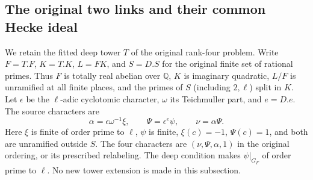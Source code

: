 \subsection{The original two links and their common Hecke ideal}
\label{subsec:rh-rank-four-link-ideal}

We retain the fitted deep tower $T$ of the original rank-four problem.
Write $F=T.F$, $K=T.K$, $L=FK$, and $S=D.S$ for the original finite
set of rational primes. Thus $F$ is totally real abelian over
$\mathbb Q$, $K$ is imaginary quadratic, $L/F$ is unramified at all
finite places, and the primes of $S$ (including $2,\ell$) split in $K$.
Let $\epsilon$ be the $\ell$-adic cyclotomic character,
$\omega$ its Teichmuller part, and $e=D.e$. The source characters are
\[
 \alpha=\epsilon\omega^{-1}\xi,\qquad \Psi=\epsilon^e\psi,\qquad
 \nu=\alpha\Psi .
\]
Here $\xi$ is finite of order prime to $\ell$, $\psi$ is finite,
$\xi(c)=-1$, $\Psi(c)=1$, and both are unramified outside $S$.
The four characters are $(\nu,\Psi,\alpha,1)$ in the original
ordering, or its prescribed relabeling. The deep condition makes
$\psi|_{G_F}$ of order prime to $\ell$. No new tower extension is
made in this subsection.

